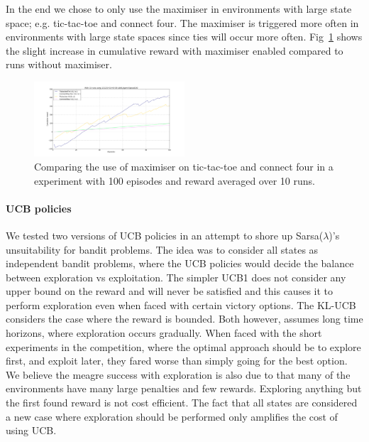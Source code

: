 In the end we chose to only use the maximiser in environments with large state
space; e.g. tic-tac-toe and connect four. The maximiser is triggered more often in
environments with large state spaces since ties will occur more often.
Fig~\ref{fig:tiemaximiser} shows the slight increase in cumulative reward with
maximiser enabled compared to runs without maximiser.
\begin{figure}[h]
    \centering
    \includegraphics[width=0.5\textwidth]{../data/tiebreakerplotconnectfourtictactoe.png}
    \caption{Comparing the use of maximiser on tic-tac-toe and connect four in a experiment with 100 episodes and reward averaged over 10 runs. }
    \label{fig:tiemaximiser}
\end{figure}
\paragraph{UCB policies}
We tested two versions of UCB policies in an attempt to shore up
Sarsa($\lambda$)'s unsuitability for bandit problems. The idea was to consider
all states as independent bandit problems, where the UCB policies would decide
the balance between exploration vs exploitation. The simpler UCB1 does not
consider any upper bound on the reward and will never be satisfied and this causes
it to perform exploration even when faced with certain victory options. The KL-UCB
considers the case where the reward is bounded. Both however, assumes long time
horizons, where exploration occurs gradually. When faced with the short
experiments in the competition, where the optimal approach should be to explore
first, and exploit later, they fared worse than simply going for the best
option. We believe the meagre success with exploration is also due to that many 
of the environments have many large penalties and few rewards. Exploring anything 
but the first found reward is not cost efficient. The fact that all states are considered a new
case where exploration should be performed only amplifies the cost of using UCB.

